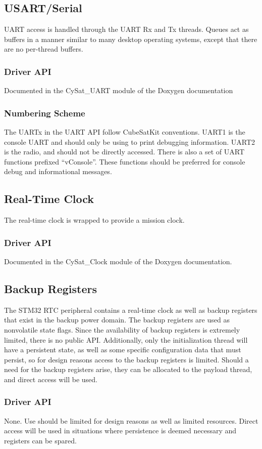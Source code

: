 \documentclass{article}
\begin{document}
\subsection{USART/Serial}
UART access is handled through the UART Rx and Tx threads. Queues act as
buffers in a manner similar to many desktop operating systems, except that
there are no per-thread buffers.
\subsubsection{Driver API}
Documented in the CySat\_UART module of the Doxygen documentation
\subsubsection{Numbering Scheme}
The UARTx in the UART API follow CubeSatKit conventions. UART1 is the console
UART and should only be using to print debugging information. UART2 is the radio, and
should not be directly accessed. There is also a set of UART functions prefixed ``vConsole''.
These functions should be preferred for console debug and informational messages.

\subsection{Real-Time Clock}
The real-time
clock is wrapped to provide a mission clock.
\subsubsection{Driver API}
Documented in the CySat\_Clock module of the Doxygen documentation.

\subsection{Backup Registers}
The STM32 RTC peripheral contains a real-time clock as well as 
backup registers that exist in the backup power domain. The backup registers are 
used as nonvolatile state flags. Since the availability of backup registers
is extremely limited, there is no public API. Additionally, only the
initialization thread will have a persistent state, as well as some 
specific configuration data that must persist, so for design reasons
access to the backup registers is limited. Should a need for the backup
registers arise, they can be allocated to the payload thread, and direct
access will be used.
\subsubsection{Driver API}
None. Use should be limited for design reasons as well as limited resources. Direct
access will be used in situations where persistence is deemed necessary and
registers can be spared.
\end{document}
